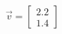 \documentclass[preview]{standalone}
\begin{document}
\begin{align*}
\vec{v}=\begin{bmatrix}2.2\\1.4\end{bmatrix}
\end{align*}
\end{document}
